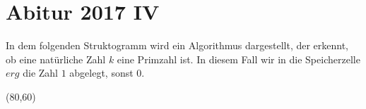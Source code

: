 \documentclass{lehramt-informatik-aufgabe}
\begin{document}

\section{Abitur 2017 IV
}

In dem folgenden Struktogramm wird ein Algorithmus dargestellt, der
erkennt, ob eine natürliche Zahl $k$ eine Primzahl ist. In diesem Fall
wir in die Speicherzelle $erg$ die Zahl $1$ abgelegt, sonst $0$.

\begin{center}
\begin{struktogramm}(80,60)
\change


    \change
    \ifend
  \untilend

  \change
  \ifend
\ifend
\end{struktogramm}
\end{center}
\end{document}
